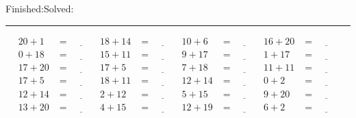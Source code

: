 \documentclass{article}
\begin{document}
\begin{sloppy}
\begin{center}
{\selectfont {Started:}\underline{\hspace{1.5cm}}{Finished:}\underline{\hspace{1.5cm}}{Solved:}\underline{\hspace{1.5cm}}}
\end{center}
\hrule
\begin{align*}
    {20} + {1} &= \underline{\hspace{1cm}} & {18} + {14} &= \underline{\hspace{1cm}} & {10} + {6} &= \underline{\hspace{1cm}} & {16} + {20} &= \underline{\hspace{1cm}} \\
    {0} + {18} &= \underline{\hspace{1cm}} & {15} + {11} &= \underline{\hspace{1cm}} & {9} + {17} &= \underline{\hspace{1cm}} & {1} + {17} &= \underline{\hspace{1cm}} \\
    {17} + {20} &= \underline{\hspace{1cm}} & {17} + {5} &= \underline{\hspace{1cm}} & {7} + {18} &= \underline{\hspace{1cm}} & {11} + {11} &= \underline{\hspace{1cm}} \\
    {17} + {5} &= \underline{\hspace{1cm}} & {18} + {11} &= \underline{\hspace{1cm}} & {12} + {14} &= \underline{\hspace{1cm}} & {0} + {2} &= \underline{\hspace{1cm}} \\
    {12} + {14} &= \underline{\hspace{1cm}} & {2} + {12} &= \underline{\hspace{1cm}} & {5} + {15} &= \underline{\hspace{1cm}} & {9} + {20} &= \underline{\hspace{1cm}} \\
    {13} + {20} &= \underline{\hspace{1cm}} & {4} + {15} &= \underline{\hspace{1cm}} & {12} + {19} &= \underline{\hspace{1cm}} & {6} + {2} &= \underline{\hspace{1cm}} \\

\end{align*}
\end{sloppy}
\end{document}
